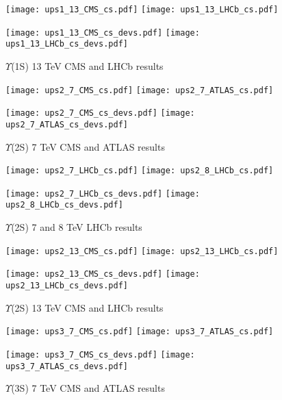 \documentclass{article}
\begin{document}
\clearpage

\begin{figure}
\centering
\texttt{[image: ups1\_13\_CMS\_cs.pdf]}
\texttt{[image: ups1\_13\_LHCb\_cs.pdf]}

\texttt{[image: ups1\_13\_CMS\_cs\_devs.pdf]}
\texttt{[image: ups1\_13\_LHCb\_cs\_devs.pdf]}
\caption{$\Upsilon$(1S) 13 TeV CMS and LHCb results}
\end{figure}

\clearpage

\begin{figure}
\centering
\texttt{[image: ups2\_7\_CMS\_cs.pdf]}
\texttt{[image: ups2\_7\_ATLAS\_cs.pdf]}

\texttt{[image: ups2\_7\_CMS\_cs\_devs.pdf]}
\texttt{[image: ups2\_7\_ATLAS\_cs\_devs.pdf]}
\caption{$\Upsilon$(2S) 7 TeV CMS and ATLAS results}
\end{figure}

\clearpage

\begin{figure}
\centering
\texttt{[image: ups2\_7\_LHCb\_cs.pdf]}
\texttt{[image: ups2\_8\_LHCb\_cs.pdf]}

\texttt{[image: ups2\_7\_LHCb\_cs\_devs.pdf]}
\texttt{[image: ups2\_8\_LHCb\_cs\_devs.pdf]}
\caption{$\Upsilon$(2S) 7 and 8 TeV LHCb results}
\end{figure}

\clearpage

\begin{figure}
\centering
\texttt{[image: ups2\_13\_CMS\_cs.pdf]}
\texttt{[image: ups2\_13\_LHCb\_cs.pdf]}

\texttt{[image: ups2\_13\_CMS\_cs\_devs.pdf]}
\texttt{[image: ups2\_13\_LHCb\_cs\_devs.pdf]}
\caption{$\Upsilon$(2S) 13 TeV CMS and LHCb results}
\end{figure}

\clearpage

\begin{figure}
\centering
\texttt{[image: ups3\_7\_CMS\_cs.pdf]}
\texttt{[image: ups3\_7\_ATLAS\_cs.pdf]}

\texttt{[image: ups3\_7\_CMS\_cs\_devs.pdf]}
\texttt{[image: ups3\_7\_ATLAS\_cs\_devs.pdf]}
\caption{$\Upsilon$(3S) 7 TeV CMS and ATLAS results}
\end{figure}
\end{document}
